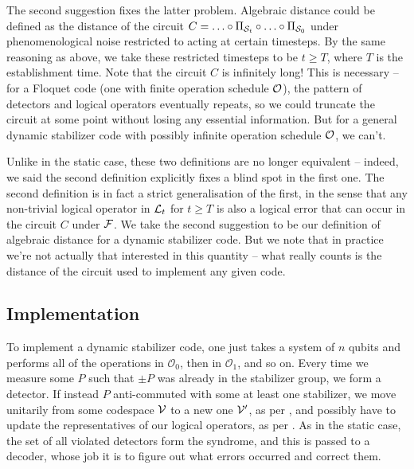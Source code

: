 The second suggestion fixes the latter problem.
Algebraic distance could be defined as the distance of the circuit $C = \ldots \circ \Pi_{\mathcal{S}_t} \circ \ldots \circ \Pi_{\mathcal{S}_0}$ under phenomenological noise restricted to acting at certain timesteps.
By the same reasoning as above, we take these restricted timesteps to be $t \geq T$, where $T$ is the establishment time.
Note that the circuit $C$ is infinitely long!
This is necessary -- for a Floquet code (one with finite operation schedule $\mathcal{O}$), the pattern of detectors and logical operators eventually repeats, so we could truncate the circuit at some point without losing any essential information.
But for a general dynamic stabilizer code with possibly infinite operation schedule $\mathcal{O}$, we can't.

Unlike in the static case, these two definitions are no longer equivalent -- indeed, we said the second definition explicitly fixes a blind spot in the first one.
The second definition is in fact a strict generalisation of the first, in the sense that any non-trivial logical operator in $\mathcal{L}_t$ for $t \geq T$ is also a logical error that can occur in the circuit $C$ under $\mathcal{F}$.
We take the second suggestion to be our definition of algebraic distance for a dynamic stabilizer code.
But we note that in practice we're not actually that interested in this quantity -- what really counts is the distance of the circuit used to implement any given code.

\subsection{Implementation}

To implement a dynamic stabilizer code, one just takes a system of $n$ qubits and performs all of the operations in $\mathcal{O}_0$, then in $\mathcal{O}_1$, and so on.
Every time we measure some $P$ such that $\pm P$ was already in the stabilizer group, we form a detector.
If instead $P$ anti-commuted with some at least one stabilizer, we move unitarily from some codespace $\mathcal{V}$ to a new one $\mathcal{V}'$, as per , and possibly have to update the representatives of our logical operators, as per .
As in the static case, the set of all violated detectors form the syndrome, and this is passed to a decoder, whose job it is to figure out what errors occurred and correct them.

